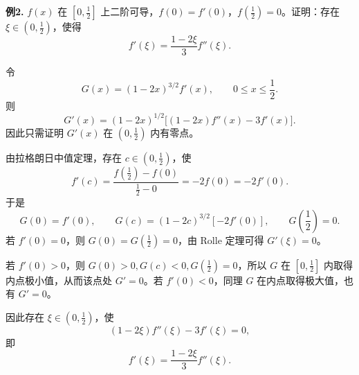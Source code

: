 \begin{problemblock}
\textbf{例2.} \(f(x)\) 在 \(\left[0,\frac12\right]\) 上二阶可导，\(f(0)=f'(0)\)，\(f\left(\frac12\right)=0\)。证明：存在 \(\xi\in\left(0,\frac12\right)\)，使得
\[
f'(\xi)=\frac{1-2\xi}{3}f''(\xi).
\]
\end{problemblock}
\begin{solutionblock}
令
\[
G(x)=(1-2x)^{3/2}f'(x),\qquad 0\le x\le\frac12.
\]
则
\[
G'(x)=(1-2x)^{1/2}\bigl[(1-2x)f''(x)-3f'(x)\bigr].
\]
因此只需证明 \(G'(x)\) 在 \(\left(0,\frac12\right)\) 内有零点。

由拉格朗日中值定理，存在 \(c\in\left(0,\frac12\right)\)，使
\[
f'(c)=\frac{f\left(\frac12\right)-f(0)}{\frac12-0}=-2f(0)=-2f'(0).
\]
于是
\[
G(0)=f'(0),\qquad
G(c)=(1-2c)^{3/2}[-2f'(0)],\qquad
G\left(\frac12\right)=0.
\]
若 \(f'(0)=0\)，则 \(G(0)=G\left(\frac12\right)=0\)，由 Rolle 定理可得 \(G'(\xi)=0\)。

若 \(f'(0)>0\)，则 \(G(0)>0,G(c)<0,G\left(\frac12\right)=0\)，所以 \(G\) 在 \([0,\frac12]\) 内取得内点极小值，从而该点处 \(G'=0\)。若 \(f'(0)<0\)，同理 \(G\) 在内点取得极大值，也有 \(G'=0\)。

因此存在 \(\xi\in\left(0,\frac12\right)\)，使
\[
(1-2\xi)f''(\xi)-3f'(\xi)=0,
\]
即
\[
f'(\xi)=\frac{1-2\xi}{3}f''(\xi).
\]
\end{solutionblock}

